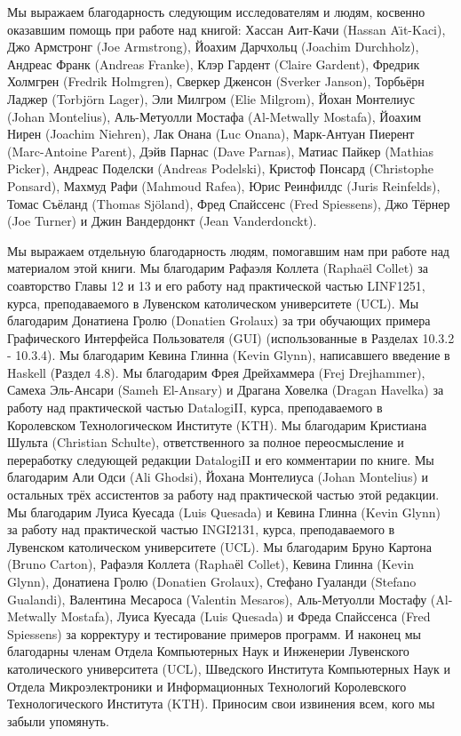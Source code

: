 Мы выражаем благодарность следующим исследователям и людям, косвенно оказавшим помощь при работе над книгой: Хассан Аит-Качи (Hassan A{\"\i}t-Kaci), Джо Армстронг (Joe Armstrong), Йоахим Дарчхольц (Joachim Durchholz), Андреас Франк (Andreas Franke), Клэр Гардент ({Claire Gardent}), Фредрик Холмгрен (Fredrik Holmgren), Сверкер Дженсон (Sverker Janson), Торбьёрн Ладжер (Torbj{\"o}rn Lager), Эли Милгром (Elie Milgrom), Йохан Монтелиус (Johan Montelius), Аль-Метуолли Мостафа (Al-Metwally Mostafa), Йоахим Нирен (Joachim Niehren), Лак Онана (Luc Onana), Марк-Антуан Пиерент (Marc-Antoine Parent), Дэйв Парнас (Dave Parnas), Матиас Пайкер (Mathias Picker), Андреас Поделски (Andreas Podelski), Кристоф Понсард (Christophe Ponsard), Махмуд Рафи (Mahmoud Rafea), Юрис Реинфилдс (Juris Reinfelds), Томас Съёланд (Thomas Sj{\"o}land), Фред Спайссенс (Fred Spiessens), Джо Тёрнер (Joe Turner) и Джин Вандердонкт (Jean Vanderdonckt).

Мы выражаем отдельную благодарность людям, помогавшим нам при работе над материалом этой книги. Мы благодарим Рафаэля Коллета ({Ra\-pha\-\"el Col\-let}) за соавторство Главы 12 и 13 и его работу над практической частью LINF1251, курса, преподаваемого в Лувенском католическом университете (UCL). Мы благодарим Донатиена Гролю (Donatien Grolaux) за три обучающих примера Графического Интерфейса Пользователя (GUI) (использованные в Разделах 10.3.2 - 10.3.4). Мы благодарим Кевина Глинна (Kevin Glynn), написавшего введение в Haskell (Раздел 4.8). Мы благодарим Фрея Дрейхаммера (Frej Drejhammer), Самеха Эль-Ансари (Sameh El-Ansary) и Драгана Ховелка (Dragan Havelka) за работу над практической частью DatalogiII, курса, преподаваемого в Королевском Технологическом Институте (KTH). Мы благодарим Кристиана Шульта (Christian Schulte), ответственного за полное переосмысление и переработку следующей редакции DatalogiII и его комментарии по книге. Мы благодарим Али Одси (Ali Ghodsi), Йохана Монтелиуса (Johan Montelius) и остальных трёх ассистентов за работу над практической частью этой редакции. Мы благодарим Луиса Куесада (Luis Quesada) и Кевина Глинна (Kevin Glynn) за работу над практической частью INGI2131, курса, преподаваемого в Лувенском католическом университете (UCL). Мы благодарим Бруно Картона (Bruno Carton), Рафаэля Коллета (Raphaёl Collet), Кевина Глинна (Kevin Glynn), Донатиена Гролю (Donatien Grolaux), Стефано Гуаланди (Stefano Gualandi), Валентина Месароса (Valentin Mesaros), Аль-Метуолли Мостафу (Al-Metwally Mostafa), Луиса Куесада (Luis Quesada) и Фреда Спайссенса (Fred Spiessens) за корректуру и тестирование примеров программ. И наконец мы благодарны членам Отдела Компьютерных Наук и Инженерии Лувенского католического университета (UCL), Шведского Института Компьютерных Наук и Отдела Микроэлектроники и Информационных Технологий Королевского Технологического Института (KTH). Приносим свои извинения всем, кого мы забыли упомянуть.

